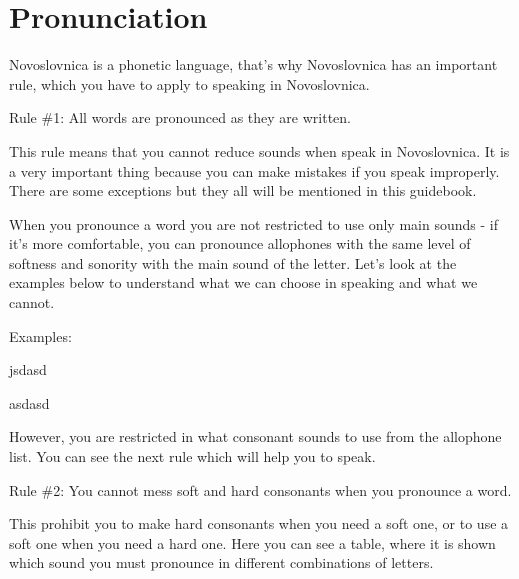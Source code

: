\section{Pronunciation}

Novoslovnica is a phonetic language, that’s why Novoslovnica has an important rule, which you have to apply to speaking in Novoslovnica.

Rule \#1: All words are pronounced as they are written.

This rule means that you cannot reduce sounds when speak in Novoslovnica. It is a very important thing because you can make mistakes if you speak improperly. There are some exceptions but they all will be mentioned in this guidebook.

When you pronounce a word you are not restricted to use only main sounds - if it’s more comfortable, you can pronounce allophones with the same level of softness and sonority with the main sound of the letter. Let’s look at the examples below to understand what we can choose in speaking and what we cannot.

Examples:

jsdasd

asdasd

However, you are restricted in what consonant sounds to use from the allophone list. You can see the next rule which will help you to speak.

Rule \#2: You cannot mess soft and hard consonants when you pronounce a word.

This prohibit you to make hard consonants when you need a soft one, or to use a soft one when you need a hard one. Here you can see a table, where it is shown which sound you must pronounce in different combinations of letters.

